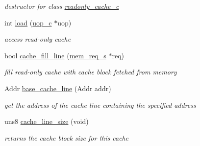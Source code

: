 \begin{DoxyCompactItemize}
\begin{DoxyCompactList}\small\item\em destructor for class \hyperlink{classreadonly__cache__c}{readonly\_\-cache\_\-c} \item\end{DoxyCompactList}\item 
int \hyperlink{classreadonly__cache__c_a98b0277cadd6d69a00117308f8a6240a}{load} (\hyperlink{classuop__c}{uop\_\-c} $\ast$uop)
\begin{DoxyCompactList}\small\item\em access read-\/only cache \item\end{DoxyCompactList}\item 
bool \hyperlink{classreadonly__cache__c_a39ccea777d82b408e93204a36be6e62b}{cache\_\-fill\_\-line} (\hyperlink{structmem__req__s}{mem\_\-req\_\-s} $\ast$req)
\begin{DoxyCompactList}\small\item\em fill read-\/only cache with cache block fetched from memory \item\end{DoxyCompactList}\item 
Addr \hyperlink{classreadonly__cache__c_a97bd29bf671a12227a4e8ba873b2c75d}{base\_\-cache\_\-line} (Addr addr)
\begin{DoxyCompactList}\small\item\em get the address of the cache line containing the specified address \item\end{DoxyCompactList}\item 
uns8 \hyperlink{classreadonly__cache__c_aecef923fdc8f384600267fcbe2f69b3b}{cache\_\-line\_\-size} (void)
\begin{DoxyCompactList}\small\item\em returns the cache block size for this cache \item\end{DoxyCompactList}\end{DoxyCompactItemize}
